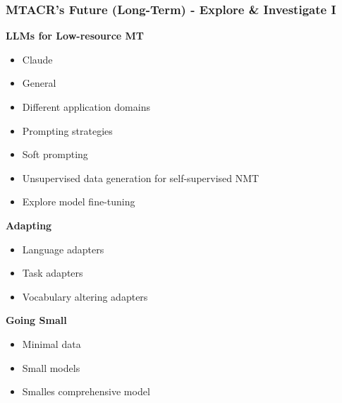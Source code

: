 \documentclass[aspectratio=169]{beamer}
\begin{document}
\begin{frame}[fragile]
	\frametitle{MTACR's Future (Long-Term) - Explore \& Investigate I}
    \begin{minipage}{.50\textwidth}
    \footnotesize
    \textbf{LLMs for Low-resource MT}
    \begin{itemize}
        \item Claude \citep{enis2024LLMNMTAdvancing} %
        \item General \citep{richburg2024HowMultilingualAre} %
        \item Different application domains \citep{zheng2024HowWellLLMs} %
        \item Prompting strategies \citep{schulhoff2024PromptReportSystematic} %
        \item Soft prompting \citep{vykopal2024SoftLanguagePrompts} %
        \item Unsupervised data generation for self-supervised NMT \citep{ruiter2021IntegratingUnsupervisedDataa} %
        \item Explore model fine-tuning
    \end{itemize}
    \end{minipage}%
    \begin{minipage}{.50\textwidth}
    \footnotesize
    \textbf{Adapting}
    \begin{itemize}
        \item Language adapters \citep{gurgurov2024AdaptingMultilingualLLMs, parovic2022BADXBilingualAdapters, ustun2022UDapterTypologybasedLanguage} %
        \item Task adapters \citep{held2023TADATaskAgnosticDialect, pfeiffer2021AdapterFusionNonDestructiveTask, pfeiffer2020MADXAdapterBasedFramework} %
        \item Vocabulary altering adapters \citep{han2024AdaptersAlteringLLM} %
    \end{itemize}
    \textbf{Going Small}
    \begin{itemize}
        \item Minimal data \citep{maillard2023SmallDataBig} %
        \item Small models \citep{gurgurov2025SmallModelsBig} %
        \item Smalles comprehensive model \citep{eldan2023TinyStoriesHowSmall} %
    \end{itemize}
    \end{minipage}
\end{frame}
\end{document}
